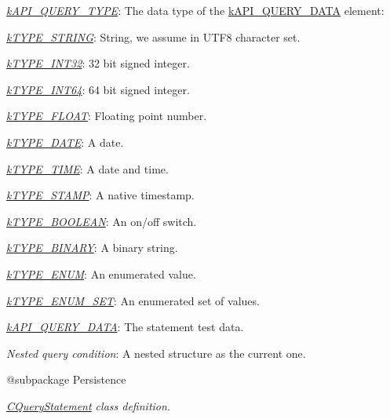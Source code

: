 {\begin{DoxyItemize}
\begin{DoxyItemize}
\begin{DoxyItemize}
\begin{DoxyItemize}
\end{DoxyItemize}
\item {\itshape \hyperlink{}{k\-A\-P\-I\-\_\-\-Q\-U\-E\-R\-Y\-\_\-\-T\-Y\-P\-E}}\-: The data type of the \hyperlink{}{k\-A\-P\-I\-\_\-\-Q\-U\-E\-R\-Y\-\_\-\-D\-A\-T\-A} element\-: 
\begin{DoxyItemize}
\item {\itshape \hyperlink{}{k\-T\-Y\-P\-E\-\_\-\-S\-T\-R\-I\-N\-G}}\-: String, we assume in U\-T\-F8 character set. 
\item {\itshape \hyperlink{}{k\-T\-Y\-P\-E\-\_\-\-I\-N\-T32}}\-: 32 bit signed integer. 
\item {\itshape \hyperlink{}{k\-T\-Y\-P\-E\-\_\-\-I\-N\-T64}}\-: 64 bit signed integer. 
\item {\itshape \hyperlink{}{k\-T\-Y\-P\-E\-\_\-\-F\-L\-O\-A\-T}}\-: Floating point number. 
\item {\itshape \hyperlink{}{k\-T\-Y\-P\-E\-\_\-\-D\-A\-T\-E}}\-: A date. 
\item {\itshape \hyperlink{}{k\-T\-Y\-P\-E\-\_\-\-T\-I\-M\-E}}\-: A date and time. 
\item {\itshape \hyperlink{}{k\-T\-Y\-P\-E\-\_\-\-S\-T\-A\-M\-P}}\-: A native timestamp. 
\item {\itshape \hyperlink{}{k\-T\-Y\-P\-E\-\_\-\-B\-O\-O\-L\-E\-A\-N}}\-: An on/off switch. 
\item {\itshape \hyperlink{}{k\-T\-Y\-P\-E\-\_\-\-B\-I\-N\-A\-R\-Y}}\-: A binary string. 
\item {\itshape \hyperlink{}{k\-T\-Y\-P\-E\-\_\-\-E\-N\-U\-M}}\-: An enumerated value. 
\item {\itshape \hyperlink{}{k\-T\-Y\-P\-E\-\_\-\-E\-N\-U\-M\-\_\-\-S\-E\-T}}\-: An enumerated set of values. 
\end{DoxyItemize}
\item {\itshape \hyperlink{}{k\-A\-P\-I\-\_\-\-Q\-U\-E\-R\-Y\-\_\-\-D\-A\-T\-A}}\-: The statement test data. 
\end{DoxyItemize}
\item {\itshape Nested query condition}\-: A nested structure as the current one. 
\end{DoxyItemize}
\end{DoxyItemize}}

{\itshape \begin{DoxyVerb} @subpackage        Persistence\end{DoxyVerb}
}

{\itshape {\itshape \hyperlink{class_c_query_statement}{C\-Query\-Statement}} class definition.}

